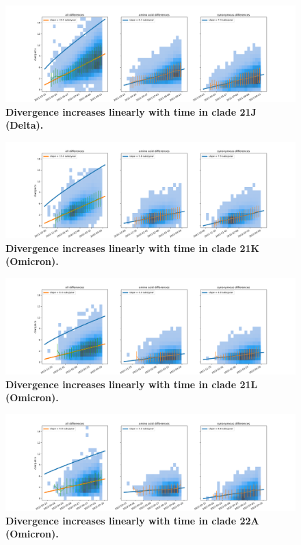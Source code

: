 \begin{figure}
    \includegraphics[width=\textwidth]{figures/rtt/21J_rtt.png}
    \caption{{\bf Divergence increases linearly with time in clade 21J (Delta).}
    \label{fig:21J_divergence}}
\end{figure}

\begin{figure}
    \includegraphics[width=\textwidth]{figures/rtt/21K_rtt.png}
    \caption{{\bf Divergence increases linearly with time in clade 21K (Omicron).}
    \label{fig:21K_divergence}}
\end{figure}

\begin{figure}
    \includegraphics[width=\textwidth]{figures/rtt/21L_rtt.png}
    \caption{{\bf Divergence increases linearly with time in clade 21L (Omicron).}
    \label{fig:21L_divergence}}
\end{figure}

\begin{figure}
    \includegraphics[width=\textwidth]{figures/rtt/22A_rtt.png}
    \caption{{\bf Divergence increases linearly with time in clade 22A (Omicron).}
    \label{fig:22A_divergence}}
\end{figure}

